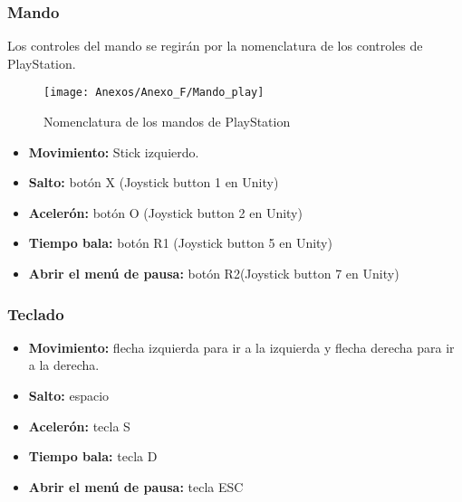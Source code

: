 \subsubsection{Mando}
Los controles del mando se regirán por la nomenclatura de los controles de PlayStation.

\begin{figure}[h]
\centering
\texttt{[image: Anexos/Anexo\_F/Mando\_play]}
\caption{Nomenclatura de los mandos de PlayStation}
\end{figure}

\begin{itemize}
\item
\textbf{Movimiento:} Stick izquierdo.
\item
\textbf{Salto:} botón X (Joystick button 1 en Unity)
\item
\textbf{Acelerón:} botón O (Joystick button 2 en Unity)
\item
\textbf{Tiempo bala:} botón R1 (Joystick button 5 en Unity)
\item
\textbf{Abrir el menú de pausa:} botón R2(Joystick button 7 en Unity)
\end{itemize}

\subsubsection{Teclado}
\begin{itemize}
\item
\textbf{Movimiento:} flecha izquierda para ir a la izquierda y flecha derecha para ir a la derecha.
\item
\textbf{Salto:} espacio 
\item
\textbf{Acelerón:} tecla S
\item
\textbf{Tiempo bala:} tecla D
\item
\textbf{Abrir el menú de pausa:} tecla ESC
\end{itemize}

